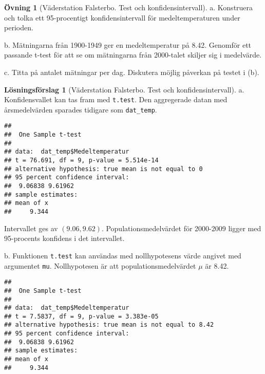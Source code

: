\documentclass[
]{book}
\newenvironment{Shaded}{\begin{snugshade}}{\end{snugshade}}
\newcommand{\AttributeTok}[1]{\textcolor[rgb]{0.77,0.63,0.00}{#1}}
\newcommand{\FloatTok}[1]{\textcolor[rgb]{0.00,0.00,0.81}{#1}}
\newcommand{\FunctionTok}[1]{\textcolor[rgb]{0.00,0.00,0.00}{#1}}
\newcommand{\NormalTok}[1]{#1}
\newcommand{\SpecialCharTok}[1]{\textcolor[rgb]{0.00,0.00,0.00}{#1}}
\theoremstyle{definition}
\theoremstyle{definition}
\theoremstyle{definition}
\newtheorem{exercise}{Övning}[chapter]
\theoremstyle{definition}
\newtheorem{hypothesis}{Lösningsförslag}[chapter]
\theoremstyle{remark}
\begin{document}
\begin{exercise}[Väderstation Falsterbo. Test och konfidensintervall]
a. Konstruera och tolka ett 95-procentigt konfidensintervall för medeltemperaturen under perioden.

b. Mätningarna från 1900-1949 ger en medeltemperatur på 8.42. Genomför ett passande t-test för att se om mätningarna från 2000-talet skiljer sig i medelvärde.

c. Titta på antalet mätningar per dag. Diskutera möjlig påverkan på testet i (b).
\end{exercise}

\begin{hypothesis}[Väderstation Falsterbo. Test och konfidensintervall]
a. Konfidensvallet kan tas fram med \texttt{t.test}. Den aggregerade datan med årsmedelvärden sparades tidigare som \texttt{dat\_temp}.

\begin{Shaded}
\end{Shaded}

\begin{verbatim}
## 
##  One Sample t-test
## 
## data:  dat_temp$Medeltemperatur
## t = 76.691, df = 9, p-value = 5.514e-14
## alternative hypothesis: true mean is not equal to 0
## 95 percent confidence interval:
##  9.06838 9.61962
## sample estimates:
## mean of x 
##     9.344
\end{verbatim}

Intervallet ges av \((9.06, 9.62)\). Populationsmedelvärdet för 2000-2009 ligger med 95-procents konfidens i det intervallet.

b. Funktionen \texttt{t.test} kan användas med nollhypotesens värde angivet med argumentet \texttt{mu}. Nollhypotesen är att populationsmedelvärdet \(\mu\) är 8.42.

\begin{Shaded}
\end{Shaded}

\begin{verbatim}
## 
##  One Sample t-test
## 
## data:  dat_temp$Medeltemperatur
## t = 7.5837, df = 9, p-value = 3.383e-05
## alternative hypothesis: true mean is not equal to 8.42
## 95 percent confidence interval:
##  9.06838 9.61962
## sample estimates:
## mean of x 
##     9.344
\end{verbatim}


\end{hypothesis}
\end{document}
